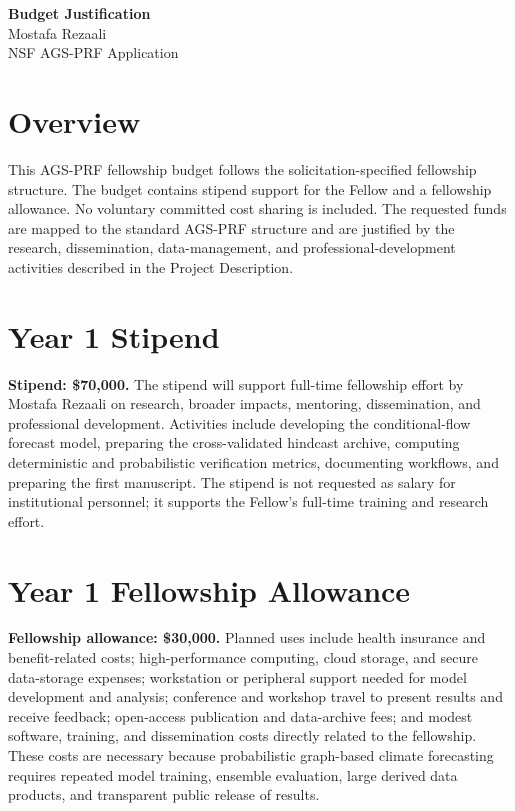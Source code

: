 \documentclass[11pt,letterpaper]{article}
\begin{document}
\begin{center}
{\Large\bfseries Budget Justification}\\[0.05in]
{\normalsize Mostafa Rezaali}\\
{\normalsize NSF AGS-PRF Application}
\end{center}
\vspace{-0.08in}
\section*{Overview}
This AGS-PRF fellowship budget follows the solicitation-specified fellowship structure. The budget contains stipend support for the Fellow and a fellowship allowance. No voluntary committed cost sharing is included. The requested funds are mapped to the standard AGS-PRF structure and are justified by the research, dissemination, data-management, and professional-development activities described in the Project Description.

\section*{Year 1 Stipend}
\textbf{Stipend: \$70,000.} The stipend will support full-time fellowship effort by Mostafa Rezaali on research, broader impacts, mentoring, dissemination, and professional development. Activities include developing the conditional-flow forecast model, preparing the cross-validated hindcast archive, computing deterministic and probabilistic verification metrics, documenting workflows, and preparing the first manuscript. The stipend is not requested as salary for institutional personnel; it supports the Fellow's full-time training and research effort.

\section*{Year 1 Fellowship Allowance}
\textbf{Fellowship allowance: \$30,000.} Planned uses include health insurance and benefit-related costs; high-performance computing, cloud storage, and secure data-storage expenses; workstation or peripheral support needed for model development and analysis; conference and workshop travel to present results and receive feedback; open-access publication and data-archive fees; and modest software, training, and dissemination costs directly related to the fellowship. These costs are necessary because probabilistic graph-based climate forecasting requires repeated model training, ensemble evaluation, large derived data products, and transparent public release of results.
\end{document}
